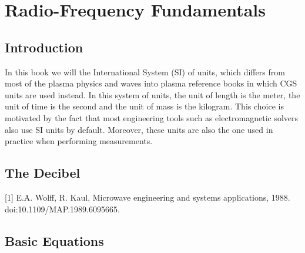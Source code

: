\chapter{Radio-Frequency Fundamentals}
\section{Introduction}
In this book we will the International System (SI) of units, which differs from most of the plasma physics and waves into plasma reference books in which CGS units are used instead. In this system of units, the unit of length is the meter, the unit of time is the second and the unit of mass is the kilogram. This choice is motivated by the fact that most engineering tools such as electromagnetic solvers also use SI units by default. Moreover, these units are also the one used in practice when performing measurements. 


\section{The Decibel}
[1] E.A. Wolff, R. Kaul, Microwave engineering and systems applications, 1988. doi:10.1109/MAP.1989.6095665.

\section{Basic Equations}
